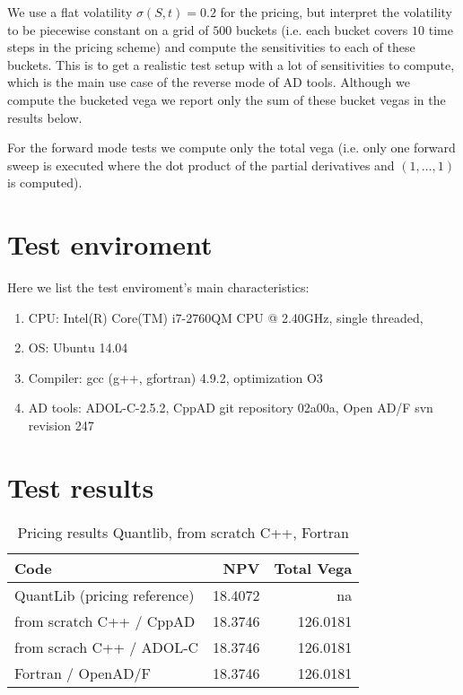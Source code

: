 \documentclass{amsart}
\theoremstyle{plain}
\numberwithin{equation}{section}
\begin{document}
We use a flat volatility $\sigma(S,t) = 0.2$ for the pricing, but interpret the volatility to be piecewise constant on a grid of $500$ buckets (i.e. each bucket covers $10$ time steps in the pricing scheme) and compute the sensitivities to each of these buckets. This is to get a realistic test setup with a lot of sensitivities to compute, which is the main use case of the reverse mode of AD tools. Although we compute the bucketed vega we report only the sum of these bucket vegas in the results below.

For the forward mode tests we compute only the total vega (i.e. only one forward sweep is executed where the dot product of the partial derivatives and $(1,\dots,1)$ is computed).

\section{Test enviroment}

Here we list the test enviroment's main characteristics:

\begin{enumerate}
\item CPU: Intel(R) Core(TM) i7-2760QM CPU @ 2.40GHz, single threaded,
\item OS: Ubuntu 14.04
\item Compiler: gcc (g++, gfortran) 4.9.2, optimization O3
\item AD tools: ADOL-C-2.5.2, CppAD git repository 02a00a, Open AD/F svn revision 247
\end{enumerate}

\section{Test results}

\begin{table}[ht]
\caption{Pricing results Quantlib, from scratch C++, Fortran}
\begin{tabular}{l | r | r}
Code & NPV & Total Vega \\ \hline
QuantLib (pricing reference) & 18.4072 & na \\
from scratch C++ / CppAD & 18.3746 & 126.0181 \\
from scrach C++ / ADOL-C & 18.3746 & 126.0181   \\
Fortran / OpenAD/F & 18.3746 & 126.0181 \\
\end{tabular}
\end{table}
\end{document}
